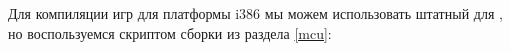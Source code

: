 \label{cross386}

Для компиляции игр для платформы i386 мы можем использовать штатный  для , но воспользуемся скриптом сборки
 из раздела \ref{mcu}:

